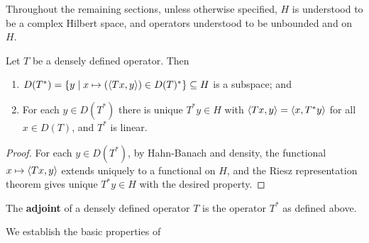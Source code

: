 \documentclass[10pt]{amsart}
\begin{document}
Throughout the remaining sections, unless otherwise specified, $H$ is understood to be a complex Hilbert space, and operators understood to be unbounded and on $H$.
\begin{lemma}
    Let $T$ be a densely defined operator. Then
    \begin{enumerate}
        \item $D(T^*) = \left\{  y \mid x \mapsto (\left\langle Tx, y \right\rangle) \in D(T)^*  \right\} \subseteq H$ is a subspace; and
        \item For each $y \in D(T^*)$ there is unique $T^*y \in H$ with $\left\langle Tx, y \right\rangle = \left\langle x, T^*y \right\rangle$ for all $x \in D(T)$, and $T^*$ is linear.
    \end{enumerate}
\end{lemma}
\begin{proof}
    For each $y \in D(T^*)$, by Hahn-Banach and density, the functional $x \mapsto \left\langle Tx, y \right\rangle$ extends uniquely to a functional on $H$, and the Riesz representation theorem gives unique $T^*y \in H$ with the desired property.
\end{proof}
\begin{definition}[Adjoint]
    The \textbf{adjoint} of a densely defined operator $T$ is the operator $T^*$ as defined above. 
\end{definition}
We establish the basic properties of 
\end{document}

